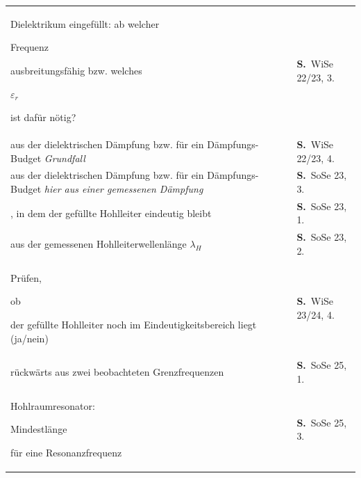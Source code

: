 \documentclass[a4paper,10pt]{article}
\newcommand{\gs}[1]{{\setlength{\fboxsep}{0.5mm}%
  \colorbox{MarkerG!45}{\strut #1}}}
\begin{document}
\begin{tabularx}{\textwidth}{@{}>{\RaggedRight}X>{\RaggedRight\scriptsize}p{27mm}@{}}
Dielektrikum eingefüllt: ab welcher \gs{Frequenz} ausbreitungsfähig bzw. welches \gs{$\varepsilon_r$} ist dafür nötig? & \textbf{S.\,\pageref{tf:WiSe22x23:2:3}} \textcolor{Grau}{WiSe 22/23, 3.} \\
\gs{$\tan\delta$} aus der dielektrischen Dämpfung bzw. für ein Dämpfungs-Budget \newline \hspace*{3mm}\textcolor{Grau}{\itshape \textendash{} Grundfall} & \textbf{S.\,\pageref{tf:WiSe22x23:2:4}} \textcolor{Grau}{WiSe 22/23, 4.} \\
\gs{$\tan\delta$} aus der dielektrischen Dämpfung bzw. für ein Dämpfungs-Budget \newline \hspace*{3mm}\textcolor{Grau}{\itshape \textendash{} hier aus einer \emph{gemessenen} Dämpfung} & \textbf{S.\,\pageref{tf:SoSe23:2:3}} \textcolor{Grau}{SoSe 23, 3.} \\
\gs{$\varepsilon_r$-Bereich}, in dem der gefüllte Hohlleiter eindeutig bleibt & \textbf{S.\,\pageref{tf:SoSe23:2:1}} \textcolor{Grau}{SoSe 23, 1.} \\
\gs{$\varepsilon_r$} aus der gemessenen Hohlleiterwellenlänge $\lambda_H$ & \textbf{S.\,\pageref{tf:SoSe23:2:2}} \textcolor{Grau}{SoSe 23, 2.} \\
Prüfen, \gs{ob} der gefüllte Hohlleiter noch im Eindeutigkeitsbereich liegt (ja/nein) & \textbf{S.\,\pageref{tf:WiSe23x24:2:4}} \textcolor{Grau}{WiSe 23/24, 4.} \\
\gs{$a$ und $b$} rückwärts aus zwei beobachteten Grenzfrequenzen & \textbf{S.\,\pageref{tf:SoSe25:2:1}} \textcolor{Grau}{SoSe 25, 1.} \\
Hohlraumresonator: \gs{Mindestlänge} für eine Resonanzfrequenz & \textbf{S.\,\pageref{tf:SoSe25:2:3}} \textcolor{Grau}{SoSe 25, 3.} \\
\hline\end{tabularx}\normalsize
\par\vspace{5mm}
\end{document}
